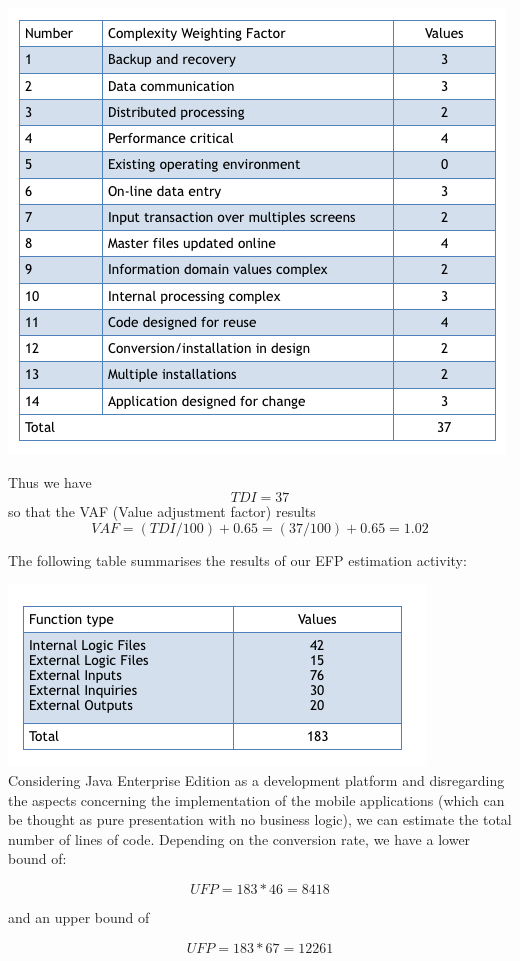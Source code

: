 \documentclass{article}
\begin{document}
\begin{flushleft}
\includegraphics[scale=0.5]{AFP}

Thus we have 
\[TDI = 37\]
so that the VAF (Value adjustment factor) results
\[VAF = (TDI/100) +0.65 = (37 /100) + 0.65= 1.02 \]


The following table summarises the results of our EFP estimation activity:

\includegraphics[scale=0.5]{FP} \\

Considering Java Enterprise Edition as a development platform and disregarding the aspects concerning the implementation of the mobile applications (which can be thought as pure presentation with no business logic), we can estimate the total number of lines of code.
Depending on the conversion rate, we have a lower bound of:

\[ UFP= 183 * 46 = 8418 \]


and an upper bound of

\[ UFP = 183 * 67 = 12261 \]


\end{flushleft}
\end{document}
